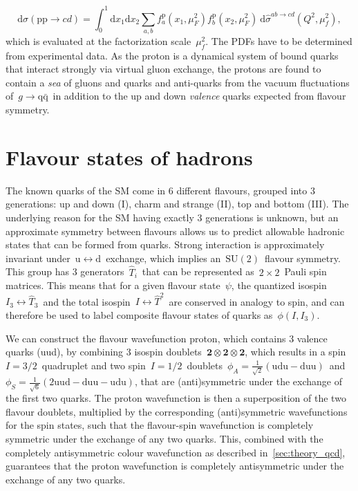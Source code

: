 \begin{equation}
\label{eq:theory_pdf_factorization}
\mathrm{d}\sigma(\mathrm{p}\mathrm{p} \rightarrow cd) = \int_0^1 \mathrm{d}x_1 \mathrm{d}x_2 \sum_{a,b} f_a^{\mathrm{p}}(x_1, \mu_F^2) f_b^{\mathrm{p}}(x_2, \mu_F^2)\ \mathrm{d}\hat{\sigma}^{ab \rightarrow cd} (Q^2, \mu_f^2),
\end{equation}
which is evaluated at the factorization scale~$\mu_f^2$. The PDFs have to be determined from experimental data. As the proton is a dynamical system of bound quarks that interact strongly via virtual gluon exchange, the protons are found to contain a \textit{sea} of gluons and quarks and anti-quarks from the vacuum fluctuations of~$g \rightarrow \mathrm{q} \bar{\mathrm{q}}$~in addition to the up and down \textit{valence} quarks expected from flavour symmetry.

\section{Flavour states of hadrons}
The known quarks of the SM come in 6 different flavours, grouped into 3 generations: up and down (I), charm and strange (II), top and bottom (III). The underlying reason for the SM having exactly 3 generations is unknown, but an approximate symmetry between flavours allows us to predict allowable hadronic states that can be formed from quarks. Strong interaction is approximately invariant under~$\mathrm{u} \leftrightarrow \mathrm{d}$~exchange, which implies an~$\mathrm{SU}(2)$~flavour symmetry. This group has 3 generators~$\hat{T}_i$~that can be represented as~$2\times2$~Pauli spin matrices. This means that for a given flavour state~$\psi$, the quantized isospin~$I_3 \leftrightarrow \hat{T}_3$~and the total isospin~$I \leftrightarrow \hat{T}^2$~are conserved in analogy to spin, and can therefore be used to label composite flavour states of quarks as~$\phi(I, I_3)$.

We can construct the flavour wavefunction proton, which contains 3 valence quarks (uud), by combining 3 isospin doublets~$\mathbf{2} \otimes \mathbf{2} \otimes \mathbf{2}$, which results in a spin~$I=3/2$~quadruplet and two spin~$I=1/2$~doublets~$\phi_A=\frac{1}{\sqrt{2}}(\mathrm{udu} - \mathrm{duu})$~and~$\phi_S = \frac{1}{\sqrt{6}}(2 \mathrm{uud} - \mathrm{duu} - \mathrm{udu})$, that are (anti)symmetric under the exchange of the first two quarks. The proton wavefunction is then a superposition of the two flavour doublets, multiplied by the corresponding (anti)symmetric wavefunctions for the spin states, such that the flavour-spin wavefunction is completely symmetric under the exchange of any two quarks. This, combined with the completely antisymmetric colour wavefunction as described in~\cref{sec:theory_qcd}, guarantees that the proton wavefunction is completely antisymmetric under the exchange of any two quarks.

